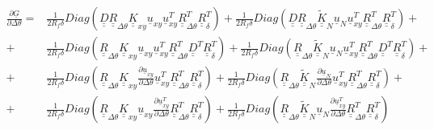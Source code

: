 \documentclass[a4paper]{jpconf}
\begin{document}
\begin{equation}
\begin{split}
\frac{\partial \underline{G}}{\partial \Delta\theta}=&\frac{1}{2R_{f}\delta}Diag\left(\underline{\underline{D}} \underline{\underline{R}}_{\Delta\theta}\underline{\underline{K}}_{xy}\underline{u}_{xy}\underline{u}_{xy}^{T}\underline{\underline{R}}_{\Delta\theta}^{T}\underline{\underline{R}}_{\delta}^{T}\right)+\frac{1}{2R_{f}\delta}Diag\left(\underline{\underline{D}}\underline{\underline{R}}_{\Delta\theta}\underline{\underline{\widetilde{K}}}_{N}\underline{u}_{N}\underline{u}_{xy}^{T}\underline{\underline{R}}_{\Delta\theta}^{T}\underline{\underline{R}}_{\delta}^{T}\right)+\\
+&\frac{1}{2R_{f}\delta}Diag\left(\underline{\underline{R}}_{\Delta\theta}\underline{\underline{K}}_{xy}\underline{u}_{xy}\underline{u}_{xy}^{T}\underline{\underline{R}}_{\Delta\theta}^{T}\underline{\underline{D}}^{T}\underline{\underline{R}}_{\delta}^{T}\right)+\frac{1}{2R_{f}\delta}Diag\left(\underline{\underline{R}}_{\Delta\theta}\underline{\underline{\widetilde{K}}}_{N}\underline{u}_{N}\underline{u}_{xy}^{T}\underline{\underline{R}}_{\Delta\theta}^{T}\underline{\underline{D}}^{T}\underline{\underline{R}}_{\delta}^{T}\right)+\\
+&\frac{1}{2R_{f}\delta}Diag\left(\underline{\underline{R}}_{\Delta\theta}\underline{\underline{K}}_{xy}\frac{\partial \underline{u}_{xy}}{\partial \Delta\theta}\underline{u}_{xy}^{T}\underline{\underline{R}}_{\Delta\theta}^{T}\underline{\underline{R}}_{\delta}^{T}\right)+\frac{1}{2R_{f}\delta}Diag\left(\underline{\underline{R}}_{\Delta\theta}\underline{\underline{\widetilde{K}}}_{N}\frac{\partial \underline{u}_{N}}{\partial \Delta\theta}\underline{u}_{xy}^{T}\underline{\underline{R}}_{\Delta\theta}^{T}\underline{\underline{R}}_{\delta}^{T}\right)+\\
+&\frac{1}{2R_{f}\delta}Diag\left(\underline{\underline{R}}_{\Delta\theta}\underline{\underline{K}}_{xy}\underline{u}_{xy}\frac{\partial \underline{u}_{xy}^{T}}{\partial \Delta\theta}\underline{\underline{R}}_{\Delta\theta}^{T}\underline{\underline{R}}_{\delta}^{T}\right)+\frac{1}{2R_{f}\delta}Diag\left(\underline{\underline{R}}_{\Delta\theta}\underline{\underline{\widetilde{K}}}_{N}\underline{u}_{N}\frac{\partial \underline{u}_{xy}^{T}}{\partial \Delta\theta}\underline{\underline{R}}_{\Delta\theta}^{T}\underline{\underline{R}}_{\delta}^{T}\right)\\
\end{split}
\end{equation}
\end{document}
